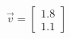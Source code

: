 \documentclass[preview]{standalone}
\begin{document}
\begin{align*}
\vec{v}=\begin{bmatrix}1.8\\1.1\end{bmatrix}
\end{align*}
\end{document}

